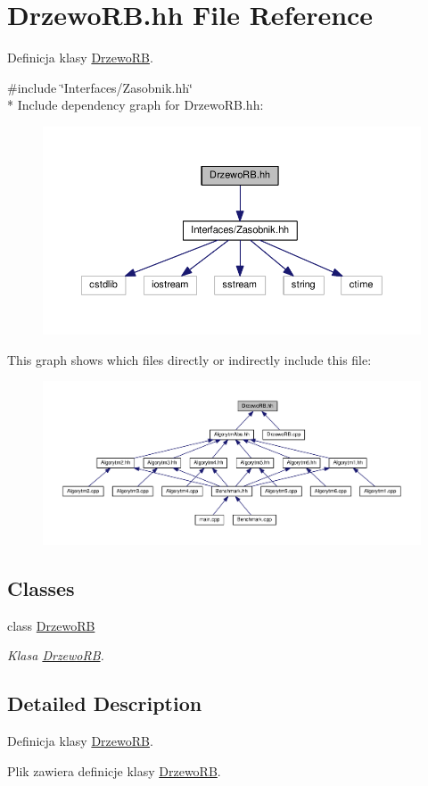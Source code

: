 \hypertarget{a00040}{}\section{Drzewo\+R\+B.\+hh File Reference}
\label{a00040}


Definicja klasy \hyperlink{a00011}{Drzewo\+R\+B}.  


{\ttfamily \#include \char`\"{}Interfaces/\+Zasobnik.\+hh\char`\"{}}\\*
Include dependency graph for Drzewo\+R\+B.\+hh\+:
\nopagebreak
\begin{figure}[H]
\begin{center}
\leavevmode
\includegraphics[width=350pt]{a00090}
\end{center}
\end{figure}
This graph shows which files directly or indirectly include this file\+:
\nopagebreak
\begin{figure}[H]
\begin{center}
\leavevmode
\includegraphics[width=350pt]{a00091}
\end{center}
\end{figure}
\subsection*{Classes}
\begin{DoxyCompactItemize}
\item 
class \hyperlink{a00011}{Drzewo\+R\+B}
\begin{DoxyCompactList}\small\item\em Klasa \hyperlink{a00011}{Drzewo\+R\+B}. \end{DoxyCompactList}\end{DoxyCompactItemize}


\subsection{Detailed Description}
Definicja klasy \hyperlink{a00011}{Drzewo\+R\+B}. 

Plik zawiera definicje klasy \hyperlink{a00011}{Drzewo\+R\+B}. 